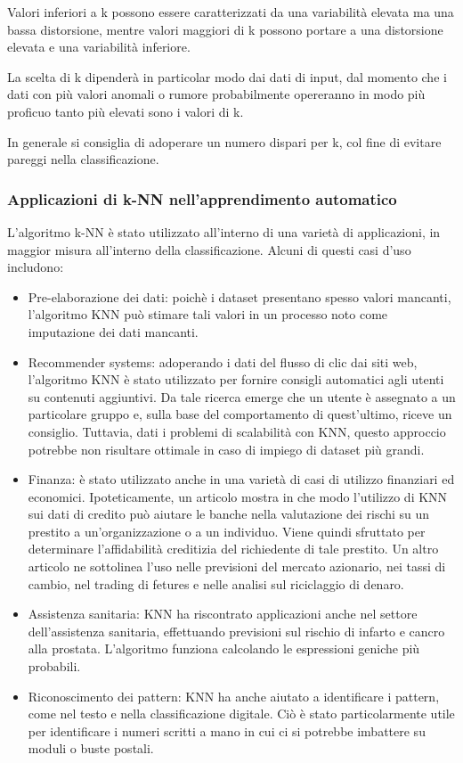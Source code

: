Valori inferiori a k possono essere caratterizzati da una variabilità elevata ma una bassa distorsione, mentre valori maggiori di k possono portare a una distorsione elevata e una variabilità inferiore. 

La scelta di k dipenderà in particolar modo dai dati di input, dal momento che i dati con più valori anomali o rumore probabilmente opereranno in modo più proficuo tanto più elevati sono i valori di k. 

In generale si consiglia di adoperare un numero dispari per k, col fine di evitare pareggi nella classificazione.

\subsubsection{Applicazioni di k-NN nell'apprendimento automatico}
L'algoritmo k-NN è stato utilizzato all'interno di una varietà di applicazioni, in maggior misura all'interno della classificazione. Alcuni di questi casi d'uso includono:
\begin{itemize}
\item Pre-elaborazione dei dati: poichè i dataset presentano spesso valori mancanti, l'algoritmo KNN può stimare tali valori in un processo noto come imputazione dei dati mancanti.
\item Recommender systems: adoperando i dati del flusso di clic dai siti web, l'algoritmo KNN è stato utilizzato per fornire consigli automatici agli utenti su contenuti aggiuntivi. Da tale ricerca emerge che un utente è assegnato a un particolare gruppo e, sulla base del comportamento di quest'ultimo, riceve un consiglio. Tuttavia, dati i problemi di scalabilità con KNN, questo approccio potrebbe non risultare ottimale in caso di impiego di dataset più grandi.
\item Finanza: è stato utilizzato anche in una varietà di casi di utilizzo finanziari ed economici. Ipoteticamente, un articolo mostra in che modo l'utilizzo di KNN sui dati di credito può aiutare le banche nella valutazione dei rischi su un prestito a un'organizzazione o a un individuo. Viene quindi sfruttato per determinare l'affidabilità creditizia del richiedente di tale prestito. Un altro articolo ne sottolinea l'uso nelle previsioni del mercato azionario, nei tassi di cambio, nel trading di fetures e nelle analisi sul riciclaggio di denaro.
\item Assistenza sanitaria: KNN ha riscontrato applicazioni anche nel settore dell'assistenza sanitaria, effettuando previsioni sul rischio di infarto e cancro alla prostata. L'algoritmo funziona calcolando le espressioni geniche più probabili.
\item Riconoscimento dei pattern: KNN ha anche aiutato a identificare i pattern, come nel testo e nella classificazione digitale. Ciò è stato particolarmente utile per identificare i numeri scritti a mano in cui ci si potrebbe imbattere su moduli o buste postali.
\end{itemize}
